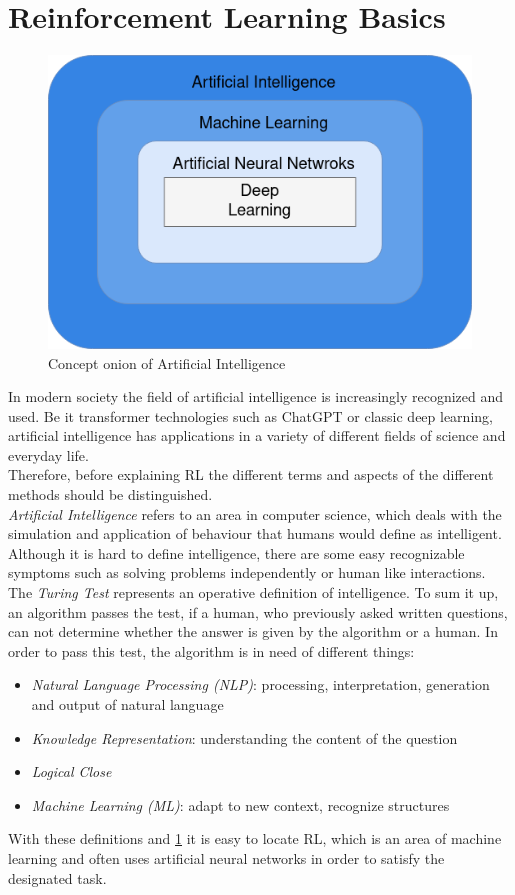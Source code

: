 \section{Reinforcement Learning Basics}
\begin{figure}
	\centering
	\includegraphics[width= 0.75 \linewidth]{figures/onion.png}
	\caption{Concept onion of Artificial Intelligence \cite{NN}}
	\label{fig:onion}
\end{figure}
In modern society the field of artificial intelligence is increasingly recognized and used.  Be it transformer technologies such as ChatGPT or classic deep learning, artificial intelligence has applications in a variety of different fields of science and everyday life.\\
Therefore, before explaining RL the different terms and aspects of the different methods should be distinguished.\\
\emph{Artificial Intelligence} refers to an area in computer science, which deals with the simulation and application of behaviour that humans would define as intelligent. Although it is hard to define intelligence, there are some easy recognizable symptoms such as solving problems independently or human like interactions. 
The \emph{Turing Test} \cite{TT} represents an operative definition of intelligence. To sum it up, an algorithm passes the test, if a human, who previously asked written questions, can not determine whether the answer is given by the algorithm or a human. In order to pass this test, the algorithm is in need of different things:
\begin{itemize}
	\item \emph{Natural Language Processing (NLP)}: processing, interpretation, generation and output of natural language
	\item \emph{Knowledge Representation}: understanding the content of the question
	\item \emph{Logical Close}
	\item \emph{Machine Learning (ML)}: adapt to new context, recognize structures
\end{itemize}
With these definitions and \cref{fig:onion} it is easy to locate RL, which is an area of machine learning and often uses artificial neural networks in order to satisfy the designated task.

